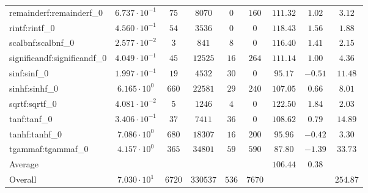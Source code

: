 \begin{tabular}{|l|c|c|c|c|c|c|c|c|}
remainderf:remainderf\_0     & $ 6.737 \cdot 10^{-1} $ & $ 75     $ & $ 8070   $ & $ 0   $ & $ 160  $ & $ 111.32      $ & $ 1.02    $ & $ 3.12    $ \\
rintf:rintf\_0               & $ 4.560 \cdot 10^{-1} $ & $ 54     $ & $ 3536   $ & $ 0   $ & $ 0    $ & $ 118.43      $ & $ 1.56    $ & $ 1.88    $ \\
scalbnf:scalbnf\_0           & $ 2.577 \cdot 10^{-2} $ & $ 3      $ & $ 841    $ & $ 8   $ & $ 0    $ & $ 116.40      $ & $ 1.41    $ & $ 2.15    $ \\
significandf:significandf\_0 & $ 4.049 \cdot 10^{-1} $ & $ 45     $ & $ 12525  $ & $ 16  $ & $ 264  $ & $ 111.14      $ & $ 1.00    $ & $ 4.36    $ \\
sinf:sinf\_0                 & $ 1.997 \cdot 10^{-1} $ & $ 19     $ & $ 4532   $ & $ 30  $ & $ 0    $ & $ 95.17       $ & $ -0.51   $ & $ 11.48   $ \\
sinhf:sinhf\_0               & $ 6.165 \cdot 10^{0}  $ & $ 660    $ & $ 22581  $ & $ 29  $ & $ 240  $ & $ 107.05      $ & $ 0.66    $ & $ 8.01    $ \\
sqrtf:sqrtf\_0               & $ 4.081 \cdot 10^{-2} $ & $ 5      $ & $ 1246   $ & $ 4   $ & $ 0    $ & $ 122.50      $ & $ 1.84    $ & $ 2.03    $ \\
tanf:tanf\_0                 & $ 3.406 \cdot 10^{-1} $ & $ 37     $ & $ 7411   $ & $ 36  $ & $ 0    $ & $ 108.62      $ & $ 0.79    $ & $ 14.89   $ \\
tanhf:tanhf\_0               & $ 7.086 \cdot 10^{0}  $ & $ 680    $ & $ 18307  $ & $ 16  $ & $ 200  $ & $ 95.96       $ & $ -0.42   $ & $ 3.30    $ \\
tgammaf:tgammaf\_0           & $ 4.157 \cdot 10^{0}  $ & $ 365    $ & $ 34801  $ & $ 59  $ & $ 590  $ & $ 87.80       $ & $ -1.39   $ & $ 33.73   $ \\
\hline
Average                      & $                     $ & $        $ & $        $ & $     $ & $      $ & $ 106.44      $ & $ 0.38    $ & $         $ \\
\hline
Overall                      & $ 7.030 \cdot 10^{1}  $ & $ 6720   $ & $ 330537 $ & $ 536 $ & $ 7670 $ & $             $ & $         $ & $ 254.87  $ \\
\hline
\end{tabular}
